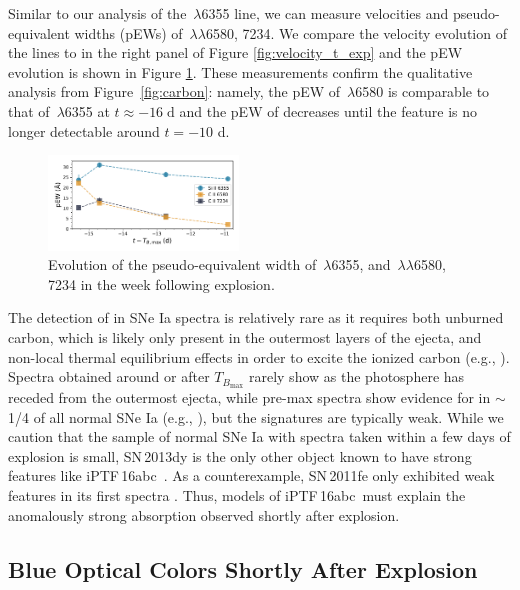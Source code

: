 \documentclass[twocolumn]{aastex61}
\newcommand{\abc}{iPTF\,16abc}
\begin{document}
Similar to our analysis of the \,$\lambda$6355 line, we 
can measure velocities and pseudo-equivalent widths (pEWs) of 
\,$\lambda\lambda$6580, 7234. We compare the velocity 
evolution of the  lines to  in the right panel 
of Figure \ref{fig:velocity_t_exp} and the pEW evolution is
shown in Figure \ref{fig:ew}. These measurements confirm the qualitative analysis from Figure~\ref{fig:carbon}: namely, the pEW of \,$\lambda$6580 is comparable to that
of \,$\lambda$6355 at $t \approx -16 \; \mathrm{d}$ and 
the pEW of  
decreases until the feature is no longer detectable 
around $t = -10$ d.

\begin{figure}[]
  \centering
  \includegraphics[width=0.45\textwidth]{pEW.pdf}
  \caption{Evolution of the pseudo-equivalent width of 
  \,$\lambda$6355, and \,$\lambda\lambda$6580, 
  7234 in the week following explosion.}
  \label{fig:ew}
\end{figure}

The detection of  in SNe Ia spectra is relatively rare
as it requires both unburned carbon, which is likely only present in the outermost layers of the ejecta, and non-local thermal equilibrium effects in order to excite the ionized carbon (e.g., \citealt{2007ApJ...654L..53T}). Spectra obtained around or after $T_{B_\mathrm{max}}$ rarely show  as the photosphere has receded from the outermost ejecta, while pre-max spectra show evidence for  in $\sim$1/4 of all normal SNe Ia (e.g., \citealt{2011ApJ...732...30P,2012MNRAS.425.1917S,2011ApJ...743...27T}), but the signatures are typically weak. While we caution that the sample of normal SNe Ia with spectra taken within a few days of explosion is small, SN\,2013dy is the only other object known to have strong  features like \abc\ \citep{2013ApJ...778L..15Z}. As a counterexample, SN\,2011fe only exhibited weak  features in its first spectra
\citep{2012ApJ...752L..26P}. Thus, models of \abc\ must explain the anomalously strong  absorption observed shortly after explosion.

\subsection{Blue Optical Colors Shortly After Explosion}
\end{document}
